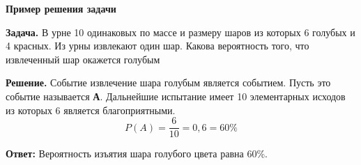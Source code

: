 \documentclass[a5paper]{article}
\begin{document}
	\vspace{\baselineskip}
	\begin{center}
		\textbf{Пример решения задачи}
	\end{center} 
	\par\textbf{Задача.} В урне 10 одинаковых по массе и размеру шаров из которых 6 голубых и 4 красных. Из урны извлекают один шар. Какова вероятность того, что извлеченный шар окажется голубым 
	
	\textbf{Решение.} Событие извлечение шара голубым является событием. Пусть это событие называется \textbf{А}. Дальнейшие испытание имеет 10 элементарных исходов из которых 6 является благоприятными. 
	\[ P(A) = \dfrac{6}{10} = 0,6 = 60\% \]
	\par \textbf{Ответ:} Вероятность изъятия шара голубого цвета равна 60\%. 
\end{document}
